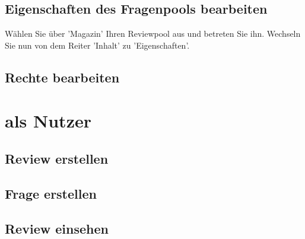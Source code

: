 \documentclass[12pt,a4paper]{scrreprt}
\begin{document}
		\subsection{Eigenschaften des Fragenpools bearbeiten}
		Wählen Sie über 'Magazin' Ihren Reviewpool aus und betreten Sie ihn. Wechseln Sie nun von dem Reiter 'Inhalt' zu 'Eigenschaften'. 
		
		
		\subsection{Rechte bearbeiten}
	\section{als Nutzer}
		\subsection{Review erstellen}
		\subsection{Frage erstellen}
		\subsection{Review einsehen}
\end{document}
